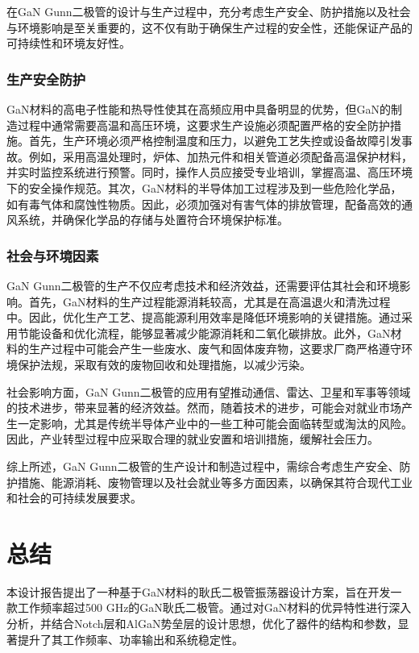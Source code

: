 \documentclass[12pt,hyperref,a4paper,UTF8]{ctexart}
\begin{document}
在GaN Gunn二极管的设计与生产过程中，充分考虑生产安全、防护措施以及社会与环境影响是至关重要的，这不仅有助于确保生产过程的安全性，还能保证产品的可持续性和环境友好性。

\subsubsection*{生产安全防护}

GaN材料的高电子性能和热导性使其在高频应用中具备明显的优势，但GaN的制造过程中通常需要高温和高压环境，这要求生产设施必须配置严格的安全防护措施。首先，生产环境必须严格控制温度和压力，以避免工艺失控或设备故障引发事故。例如，采用高温处理时，炉体、加热元件和相关管道必须配备高温保护材料，并实时监控系统进行预警。同时，操作人员应接受专业培训，掌握高温、高压环境下的安全操作规范。其次，GaN材料的半导体加工过程涉及到一些危险化学品，如有毒气体和腐蚀性物质。因此，必须加强对有害气体的排放管理，配备高效的通风系统，并确保化学品的存储与处置符合环境保护标准。

\subsubsection*{社会与环境因素}

GaN Gunn二极管的生产不仅应考虑技术和经济效益，还需要评估其社会和环境影响。首先，GaN材料的生产过程能源消耗较高，尤其是在高温退火和清洗过程中。因此，优化生产工艺、提高能源利用效率是降低环境影响的关键措施。通过采用节能设备和优化流程，能够显著减少能源消耗和二氧化碳排放。此外，GaN材料的生产过程中可能会产生一些废水、废气和固体废弃物，这要求厂商严格遵守环境保护法规，采取有效的废物回收和处理措施，以减少污染。

社会影响方面，GaN Gunn二极管的应用有望推动通信、雷达、卫星和军事等领域的技术进步，带来显著的经济效益。然而，随着技术的进步，可能会对就业市场产生一定影响，尤其是传统半导体产业中的一些工种可能会面临转型或淘汰的风险。因此，产业转型过程中应采取合理的就业安置和培训措施，缓解社会压力。

综上所述，GaN Gunn二极管的生产设计和制造过程中，需综合考虑生产安全、防护措施、能源消耗、废物管理以及社会就业等多方面因素，以确保其符合现代工业和社会的可持续发展要求。


\newpage
\section{总结}

本设计报告提出了一种基于GaN材料的耿氏二极管振荡器设计方案，旨在开发一款工作频率超过500 GHz的GaN耿氏二极管。通过对GaN材料的优异特性进行深入分析，并结合Notch层和AlGaN势垒层的设计思想，优化了器件的结构和参数，显著提升了其工作频率、功率输出和系统稳定性。
\end{document}
